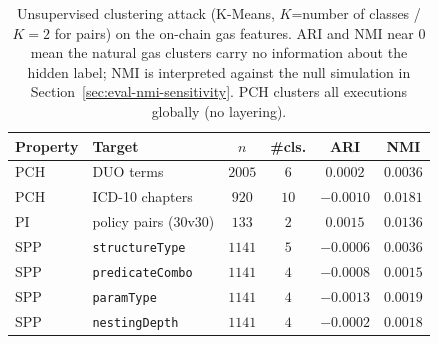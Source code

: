 \begin{table}[t]
  \centering
  \caption{Unsupervised clustering attack (K-Means, $K$=number of classes / $K{=}2$ for
    pairs) on the on-chain gas features. ARI and NMI near $0$ mean the natural gas
    clusters carry no information about the hidden label; NMI is interpreted against
    the null simulation in Section~\ref{sec:eval-nmi-sensitivity}. PCH clusters all
    executions globally (no layering).}
  \label{tab:clustering-summary}
  \footnotesize
  \setlength{\tabcolsep}{4pt}
  \begin{tabular}{@{}llcccc@{}}
    \toprule
    Property & Target & $n$ & \#cls. & ARI & NMI \\
    \midrule
    PCH & DUO terms                & $2005$ & $6$  & $0.0002$  & $0.0036$ \\
    PCH & ICD-10 chapters          & $920$  & $10$ & $-0.0010$ & $0.0181$ \\
    PI  & policy pairs ($30$v$30$) & $133$  & $2$  & $0.0015$  & $0.0136$ \\
    SPP & \texttt{structureType}  & $1141$ & $5$  & $-0.0006$ & $0.0036$ \\
    SPP & \texttt{predicateCombo} & $1141$ & $4$  & $-0.0008$ & $0.0015$ \\
    SPP & \texttt{paramType}      & $1141$ & $4$  & $-0.0013$ & $0.0019$ \\
    SPP & \texttt{nestingDepth}   & $1141$ & $4$  & $-0.0002$ & $0.0018$ \\
    \bottomrule
  \end{tabular}
\end{table}
